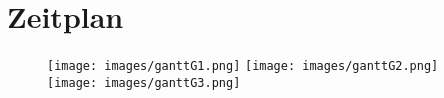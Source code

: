\section{Zeitplan}
\label{ch:Zeitplan}

%

\begin{figure}[h]
	\texttt{[image: images/ganttG1.png]}
	\newline
	\texttt{[image: images/ganttG2.png]}
	\newline
	\texttt{[image: images/ganttG3.png]}	
\end{figure}





